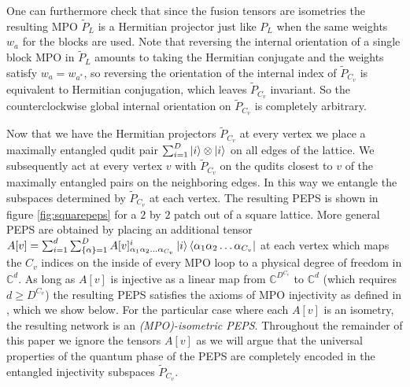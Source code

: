\documentclass[12 pt]{article}
\begin{document}
One can furthermore check that since the fusion tensors are isometries the resulting MPO $\tilde{P}_L$ is a Hermitian projector just like $P_L$ when the same weights $w_a$ for the blocks are used. Note that reversing the internal orientation of a single block MPO in $\tilde{P}_L$ amounts to taking the Hermitian conjugate and the weights satisfy $w_a = w_{a^*}$, so reversing the orientation of the internal index of $\tilde{P}_{C_v}$ is equivalent to Hermitian conjugation, which leaves $\tilde{P}_{C_v}$ invariant. So the counterclockwise global internal orientation on $\tilde{P}_{C_v}$ is completely arbitrary.

Now that we have the Hermitian projectors $\tilde{P}_{C_v}$ at every vertex we place a maximally entangled qudit pair $\sum_{i=1}^D \ket{i}\otimes\ket{i}$ on all edges of the lattice. We subsequently act at every vertex $v$ with $\tilde{P}_{C_v}$ on the qudits closest to $v$ of the maximally entangled pairs on the neighboring edges. In this way we entangle the subspaces determined by $\tilde{P}_{C_v}$ at each vertex. The resulting PEPS is shown in figure \ref{fig:squarepeps} for a $2$ by $2$ patch out of a square lattice. More general PEPS are obtained by placing an additional tensor $A[v] = \sum_{i = 1}^d \sum_{\{\alpha\} = 1}^D A[v]^i_{\alpha_1\alpha_2\dots \alpha_{C_v}}\ket{i}\bra{\alpha_1\alpha_2\dots \alpha_{C_v}}$ at each vertex which maps the $C_v$ indices on the inside of every MPO loop to a physical degree of freedom in $\mathbb{C}^d$. As long as $A[v]$ is injective as a linear map from $\mathbb{C}^{D^{C_v}}$ to $\mathbb{C}^d$ (which requires $d \geq D^{C_v}$) the resulting PEPS satisfies the axioms of MPO injectivity as defined in \cite{MPOpaper}, which we show below. For the particular case where each $A[v]$ is an isometry, the resulting network is an \emph{(MPO)-isometric PEPS}. Throughout the remainder of this paper we ignore the tensors $A[v]$ as we will argue that the universal properties of the quantum phase of the PEPS are completely encoded in the entangled injectivity subspaces $\tilde{P}_{C_v}$.
\end{document}
